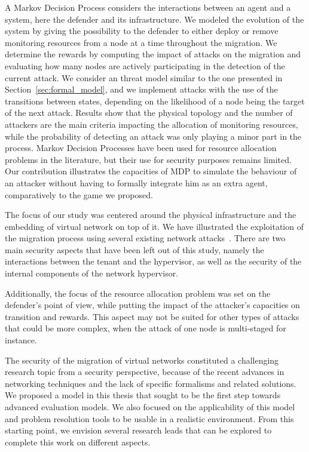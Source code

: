 A Markov Decision Process considers the interactions between an agent and a system, here the defender and its infrastructure. We modeled the evolution of the system by giving the possibility to the defender to either deploy or remove monitoring resources from a node at a time throughout the migration. We determine the rewards by computing the impact of attacks on the migration and evaluating how many nodes are actively participating in the detection of the current attack.
We consider an threat model similar to the one presented in Section~\ref{sec:formal_model}, and we implement attacks with the use of the transitions between states, depending on the likelihood of a node being the target of the next attack. 
Results show that the physical topology and the number of attackers are the main criteria impacting the allocation of monitoring resources, while the probability of detecting an attack was only playing a minor part in the process. 
Markov Decision Processes have been used for resource allocation problems in the literature, but their use for security purposes remains limited. Our contribution illustrates the capacities of MDP to simulate the behaviour of an attacker without having to formally integrate him as an extra agent, comparatively to the game we proposed.

The focus of our study was centered around the physical infrastructure and the embedding of virtual network on top of it. We have illustrated the exploitation of the migration process using several existing network attacks~\cite{Sphinx-Dhawan2015,vulnflow-Costa2013}.
There are two main security aspects that have been left out of this study, namely the interactions between the tenant and the hypervisor, as well as the security of the internal components of the network hypervisor.

Additionally, the focus of the resource allocation problem was set on the defender's point of view, while putting the impact of the attacker's capacities on transition and rewards. This aspect may not be suited for other types of attacks that could be more complex, when the attack of one node is multi-staged for instance.

The security of the migration of virtual networks constituted a challenging research topic from a security perspective, because of the recent advances in networking techniques and the lack of specific formalisms and related solutions. We proposed a model in this thesis that sought to be the first step towards advanced evaluation models. We also focused on the applicability of this model and problem resolution tools to be usable in a realistic environment. From this starting point, we envision several research leads that can be explored to complete this work on different aspects.

